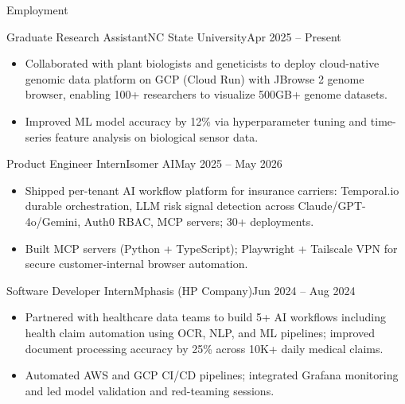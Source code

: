 \documentclass[]{mcdowellcv}
\begin{document}
\makeheader

\begin{cvsection}{Employment}
  \begin{cvsubsection}{Graduate Research Assistant}{NC State University}{Apr 2025 -- Present}
    \begin{itemize}
      \item Collaborated with plant biologists and geneticists to deploy cloud-native genomic data platform on GCP (Cloud Run) with JBrowse 2 genome browser, enabling 100+ researchers to visualize 500GB+ genome datasets.
      \item Improved ML model accuracy by 12\% via hyperparameter tuning and time-series feature analysis on biological sensor data.
    \end{itemize}
    \vspace{-1.5pt}
  \end{cvsubsection}

  \begin{cvsubsection}{Product Engineer Intern}{Isomer AI}{May 2025 -- May 2026}
    \begin{itemize}
      \item Shipped per-tenant AI workflow platform for insurance carriers: Temporal.io durable orchestration, LLM risk signal detection across Claude/GPT-4o/Gemini, Auth0 RBAC, MCP servers; 30+ deployments.
      \item Built MCP servers (Python + TypeScript); Playwright + Tailscale VPN for secure customer-internal browser automation.
    \end{itemize}
    \vspace{-1.5pt}
  \end{cvsubsection}

  \begin{cvsubsection}{Software Developer Intern}{Mphasis (HP Company)}{Jun 2024 -- Aug 2024}
    \begin{itemize}
      \item Partnered with healthcare data teams to build 5+ AI workflows including health claim automation using OCR, NLP, and ML pipelines; improved document processing accuracy by 25\% across 10K+ daily medical claims.
      \item Automated AWS and GCP CI/CD pipelines; integrated Grafana monitoring and led model validation and red-teaming sessions.
    \end{itemize}
    \vspace{-1.5pt}
  \end{cvsubsection}


\end{cvsection}
\end{document}
